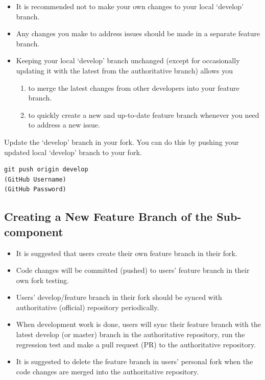 \documentclass[11pt,fleqn]{report}              %
\begin{document}
\begin{itemize}
\item It is recommended not to make your own changes to your local `develop' branch.
\item Any changes you make to address issues should be made in a separate feature branch.
\item Keeping your local `develop' branch unchanged (except for occasionally updating it with the latest from the authoritative branch) allows you
\begin{enumerate}
\item to merge the latest changes from other developers into your feature branch.
\item to quickly create a new and up-to-date feature branch whenever you need to address a new issue.
\end{enumerate}
\end{itemize}

Update the `develop' branch in your fork. You can do this by pushing your updated local `develop' branch to your fork.
\lstset{language=bash}   
\begin{lstlisting}[frame=trBL]
git push origin develop
(GitHub Username)
(GitHub Password)
\end{lstlisting}



\subsection{Creating a New Feature Branch of the Sub-component}

\begin{itemize}
\item It is suggested that users create their own feature branch in their fork.
\item Code changes will be committed (pushed) to users' feature branch in their own fork testing.
\item Users' develop/feature branch in their fork should be synced with authoritative (official) repository periodically.
\item When development work is done, users will sync their feature branch with the latest develop (or master) branch in the authoritative repository, run the regression test and make a pull request (PR) to the authoritative repository.
\item It is suggested to delete the feature branch in users' personal fork when the code changes are merged into the authoritative repository.
\end{itemize}
\end{document}

